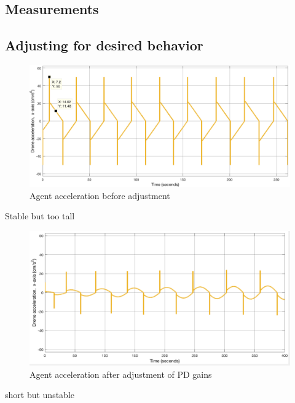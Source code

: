 \subsection{Measurements}

\subsection{Adjusting for desired behavior}
\label{sec:tuning}

\begin{figure}[H]
  \centering
  \includegraphics[width=1\columnwidth]{figures/SA_accel_pre_adjustment}
  \caption{\label{fig:pre_adjust}Agent acceleration before adjustment}
\end{figure}

Stable but too tall

\begin{figure}[H]
  \centering
  \includegraphics[width=1\columnwidth]{figures/SA_accel_pre_post_p_adjustment}
  \caption{\label{fig:post_adjust}Agent acceleration after adjustment of PD gains}
\end{figure}

short but unstable


